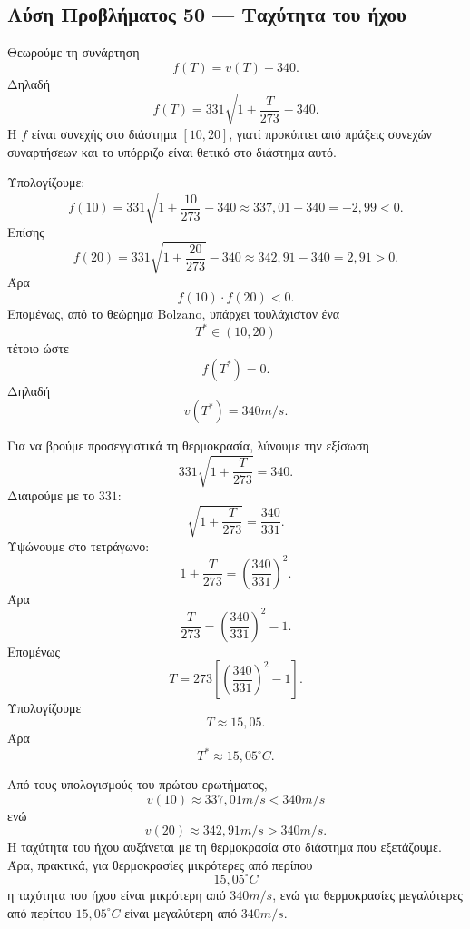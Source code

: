 \subsection*{Λύση Προβλήματος 50 --- Ταχύτητα του ήχου}

\begin{alist}
  \item Θεωρούμε τη συνάρτηση
        \[
          f(T)=v(T)-340.
        \]
        Δηλαδή
        \[
          f(T)=331\sqrt{1+\frac{T}{273}}-340.
        \]
        Η \(f\) είναι συνεχής στο διάστημα \([10,20]\), γιατί προκύπτει
        από πράξεις συνεχών συναρτήσεων και το υπόρριζο είναι θετικό στο
        διάστημα αυτό.

        Υπολογίζουμε:
        \[
          f(10)
          =
          331\sqrt{1+\frac{10}{273}}-340
          \approx
          337{,}01-340
          =
          -2{,}99<0.
        \]
        Επίσης
        \[
          f(20)
          =
          331\sqrt{1+\frac{20}{273}}-340
          \approx
          342{,}91-340
          =
          2{,}91>0.
        \]
        Άρα
        \[
          f(10)\cdot f(20)<0.
        \]
        Επομένως, από το θεώρημα Bolzano, υπάρχει τουλάχιστον ένα
        \[
          T^*\in(10,20)
        \]
        τέτοιο ώστε
        \[
          f(T^*)=0.
        \]
        Δηλαδή
        \[
          v(T^*)=340\si{m/s}.
        \]

  \item Για να βρούμε προσεγγιστικά τη θερμοκρασία, λύνουμε την εξίσωση
        \[
          331\sqrt{1+\frac{T}{273}}=340.
        \]
        Διαιρούμε με το \(331\):
        \[
          \sqrt{1+\frac{T}{273}}=\frac{340}{331}.
        \]
        Υψώνουμε στο τετράγωνο:
        \[
          1+\frac{T}{273}=\left(\frac{340}{331}\right)^2.
        \]
        Άρα
        \[
          \frac{T}{273}=\left(\frac{340}{331}\right)^2-1.
        \]
        Επομένως
        \[
          T
          =
          273\left[\left(\frac{340}{331}\right)^2-1\right].
        \]
        Υπολογίζουμε
        \[
          T\approx 15{,}05.
        \]
        Άρα
        \[
          {T^*\approx15{,}05^\circ C}.
        \]

  \item Από τους υπολογισμούς του πρώτου ερωτήματος,
        \[
          v(10)\approx337{,}01\si{m/s}<340\si{m/s}
        \]
        ενώ
        \[
          v(20)\approx342{,}91\si{m/s}>340\si{m/s}.
        \]
        Η ταχύτητα του ήχου αυξάνεται με τη θερμοκρασία στο διάστημα που
        εξετάζουμε. Άρα, πρακτικά, για θερμοκρασίες μικρότερες από
        περίπου
        \[
          15{,}05^\circ C
        \]
        η ταχύτητα του ήχου είναι μικρότερη από \(340\si{m/s}\), ενώ για
        θερμοκρασίες μεγαλύτερες από περίπου \(15{,}05^\circ C\) είναι
        μεγαλύτερη από \(340\si{m/s}\).
\end{alist}
